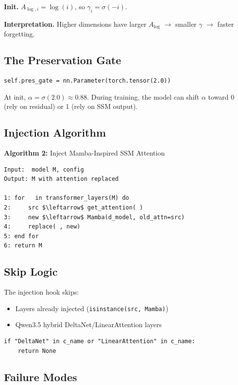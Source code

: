 \textbf{Init.} $A_{\log, i} = \log(i)$, so $\gamma_i = \sigma(-i)$.

\textbf{Interpretation.} Higher dimensions have larger $A_{\log}$ $\to$ smaller $\gamma$ 
$\to$ faster forgetting.

\subsection{The Preservation Gate}

\begin{lstlisting}
self.pres_gate = nn.Parameter(torch.tensor(2.0))
\end{lstlisting}

At init, $\alpha = \sigma(2.0) \approx 0.88$. During training, the model can 
shift $\alpha$ toward 0 (rely on residual) or 1 (rely on SSM output).

\subsection{Injection Algorithm}

\textbf{Algorithm 2:} Inject Mamba-Inspired SSM Attention
\begin{lstlisting}
Input:  model M, config
Output: M with attention replaced

1: for   in transformer_layers(M) do
2:     src $\leftarrow$ get_attention( )
3:     new $\leftarrow$ Mamba(d_model, old_attn=src)
4:     replace( , new)
5: end for
6: return M
\end{lstlisting}

\subsection{Skip Logic}

The injection hook skips:

\begin{itemize}
\item Layers already injected (\texttt{isinstance(src, Mamba)})
\item Qwen3.5 hybrid DeltaNet/LinearAttention layers

\end{itemize}
\begin{lstlisting}
if "DeltaNet" in c_name or "LinearAttention" in c_name:
    return None
\end{lstlisting}

\subsection{Failure Modes}

